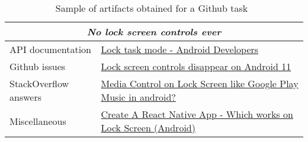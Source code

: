 \begin{table}[H]
\centering    
\begin{scriptsize}
\begin{threeparttable}
\begin{tabular}{l|l}

\hline

\multicolumn{2}{c}{\textit{No lock screen controls ever}}  \\

\hline
\hline

\multirow{1}{*}{API documentation}
& \href{https://developer.android.com/work/dpc/dedicated-devices/lock-task-mode}{Lock task mode - Android Developers} \\

\multirow{1}{*}{Github issues}
& \href{https://github.com/AntennaPod/AntennaPod/issues/4448}{Lock screen controls disappear on Android 11 } \\


\multirow{1}{*}{StackOverflow answers}
& \href{https://stackoverflow.com/questions/24652078}{Media Control on Lock Screen like Google Play Music in android?} 
\\



\multirow{1}{*}{Miscellaneous}
& \href{https://tinyurl.com/lock-task}{Create A React Native App - Which works on Lock Screen (Android) } \\

\hline


\end{tabular}
\end{threeparttable}
\end{scriptsize}
\caption{Sample of artifacts obtained for a Github task~\cite{git3578} }
\label{tbl:googlesearch-example-git}
\end{table}

